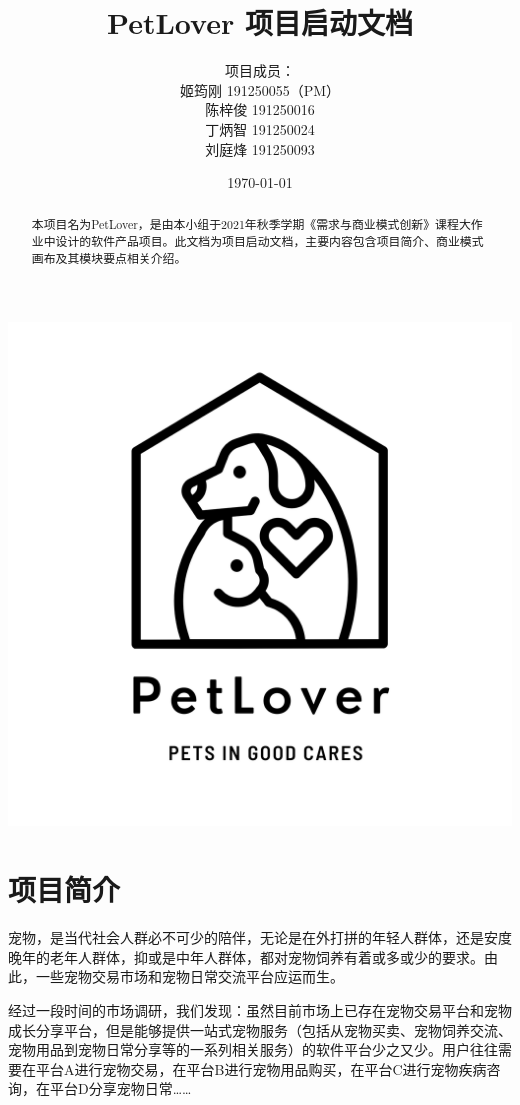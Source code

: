\documentclass[a4paper]{ctexart}
\title{\Huge PetLover 项目启动文档}
\author{
  项目成员：\\
  姬筠刚 191250055（PM）\\
  陈梓俊 191250016\\
  丁炳智 191250024\\
  刘庭烽 191250093\\
}
\date{\today}
\begin{document}
\maketitle

\centerline{\includegraphics[]{logo.png}}

\newpage

\begin{abstract}
  本项目名为PetLover，是由本小组于2021年秋季学期《需求与商业模式创新》课程大作业中设计的软件产品项目。此文档为项目启动文档，主要内容包含项目简介、商业模式画布及其模块要点相关介绍。
\end{abstract}



\tableofcontents

\newpage

\setlength{\parskip}{1em}


\section{项目简介}
宠物，是当代社会人群必不可少的陪伴，无论是在外打拼的年轻人群体，还是安度晚年的老年人群体，抑或是中年人群体，都对宠物饲养有着或多或少的要求。由此，一些宠物交易市场和宠物日常交流平台应运而生。

经过一段时间的市场调研，我们发现：虽然目前市场上已存在宠物交易平台和宠物成长分享平台，但是能够提供一站式宠物服务（包括从宠物买卖、宠物饲养交流、宠物用品到宠物日常分享等的一系列相关服务）的软件平台少之又少。用户往往需要在平台A进行宠物交易，在平台B进行宠物用品购买，在平台C进行宠物疾病咨询，在平台D分享宠物日常……
\end{document}
